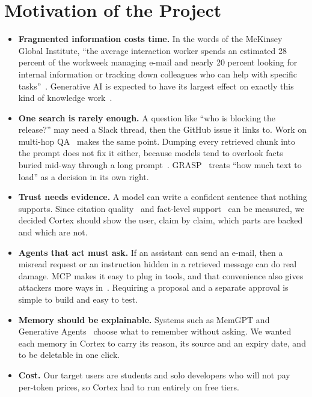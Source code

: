 \documentclass[oneside,a4paper,12pt]{report}
\begin{document}
\section{Motivation of the Project}
\begin{itemize}
\item \textbf{Fragmented information costs time.} In the words of the McKinsey Global Institute, ``the average interaction worker spends an estimated 28 percent of the workweek managing e-mail and nearly 20 percent looking for internal information or tracking down colleagues who can help with specific tasks''~\cite{mckinseyweb}. Generative AI is expected to have its largest effect on exactly this kind of knowledge work~\cite{mckinsey}.
\item \textbf{One search is rarely enough.} A question like ``who is blocking the release?'' may need a Slack thread, then the GitHub issue it links to. Work on multi-hop QA~\cite{trivedi2023ircot,press2023selfask} makes the same point. Dumping every retrieved chunk into the prompt does not fix it either, because models tend to overlook facts buried mid-way through a long prompt~\cite{liu2024lost}. GRASP~\cite{grasp2026} treats ``how much text to load'' as a decision in its own right.
\item \textbf{Trust needs evidence.} A model can write a confident sentence that nothing supports. Since citation quality~\cite{gao2023alce} and fact-level support~\cite{min2023factscore} can be measured, we decided Cortex should show the user, claim by claim, which parts are backed and which are not.
\item \textbf{Agents that act must ask.} If an assistant can send an e-mail, then a misread request or an instruction hidden in a retrieved message can do real damage. MCP makes it easy to plug in tools, and that convenience also gives attackers more ways in~\cite{hou2025mcp}. Requiring a proposal and a separate approval is simple to build and easy to test.
\item \textbf{Memory should be explainable.} Systems such as MemGPT and Generative Agents~\cite{packer2023memgpt,park2023generative} choose what to remember without asking. We wanted each memory in Cortex to carry its reason, its source and an expiry date, and to be deletable in one click.
\item \textbf{Cost.} Our target users are students and solo developers who will not pay per-token prices, so Cortex had to run entirely on free tiers.
\end{itemize}
\end{document}
